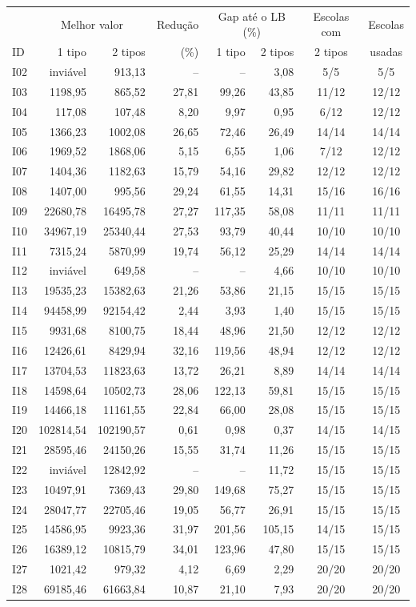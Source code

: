 \begin{tabular}{lrrrrrcc}
\hline
 & \multicolumn{2}{c}{Melhor valor} & Redução & \multicolumn{2}{c}{Gap até o LB (\%)} & Escolas com & Escolas \\
ID & 1 tipo & 2 tipos & (\%) & 1 tipo & 2 tipos & 2 tipos & usadas \\
\hline
I02 & inviável & 913,13 & -- & -- & 3,08 & 5/5 & 5/5 \\
I03 & 1198,95 & 865,52 & 27,81 & 99,26 & 43,85 & 11/12 & 12/12 \\
I04 & 117,08 & 107,48 & 8,20 & 9,97 & 0,95 & 6/12 & 12/12 \\
I05 & 1366,23 & 1002,08 & 26,65 & 72,46 & 26,49 & 14/14 & 14/14 \\
I06 & 1969,52 & 1868,06 & 5,15 & 6,55 & 1,06 & 7/12 & 12/12 \\
I07 & 1404,36 & 1182,63 & 15,79 & 54,16 & 29,82 & 12/12 & 12/12 \\
I08 & 1407,00 & 995,56 & 29,24 & 61,55 & 14,31 & 15/16 & 16/16 \\
I09 & 22680,78 & 16495,78 & 27,27 & 117,35 & 58,08 & 11/11 & 11/11 \\
I10 & 34967,19 & 25340,44 & 27,53 & 93,79 & 40,44 & 10/10 & 10/10 \\
I11 & 7315,24 & 5870,99 & 19,74 & 56,12 & 25,29 & 14/14 & 14/14 \\
I12 & inviável & 649,58 & -- & -- & 4,66 & 10/10 & 10/10 \\
I13 & 19535,23 & 15382,63 & 21,26 & 53,86 & 21,15 & 15/15 & 15/15 \\
I14 & 94458,99 & 92154,42 & 2,44 & 3,93 & 1,40 & 15/15 & 15/15 \\
I15 & 9931,68 & 8100,75 & 18,44 & 48,96 & 21,50 & 12/12 & 12/12 \\
I16 & 12426,61 & 8429,94 & 32,16 & 119,56 & 48,94 & 12/12 & 12/12 \\
I17 & 13704,53 & 11823,63 & 13,72 & 26,21 & 8,89 & 14/14 & 14/14 \\
I18 & 14598,64 & 10502,73 & 28,06 & 122,13 & 59,81 & 15/15 & 15/15 \\
I19 & 14466,18 & 11161,55 & 22,84 & 66,00 & 28,08 & 15/15 & 15/15 \\
I20 & 102814,54 & 102190,57 & 0,61 & 0,98 & 0,37 & 14/15 & 14/15 \\
I21 & 28595,46 & 24150,26 & 15,55 & 31,74 & 11,26 & 15/15 & 15/15 \\
I22 & inviável & 12842,92 & -- & -- & 11,72 & 15/15 & 15/15 \\
I23 & 10497,91 & 7369,43 & 29,80 & 149,68 & 75,27 & 15/15 & 15/15 \\
I24 & 28047,77 & 22705,46 & 19,05 & 56,77 & 26,91 & 15/15 & 15/15 \\
I25 & 14586,95 & 9923,36 & 31,97 & 201,56 & 105,15 & 14/15 & 15/15 \\
I26 & 16389,12 & 10815,79 & 34,01 & 123,96 & 47,80 & 15/15 & 15/15 \\
I27 & 1021,42 & 979,32 & 4,12 & 6,69 & 2,29 & 20/20 & 20/20 \\
I28 & 69185,46 & 61663,84 & 10,87 & 21,10 & 7,93 & 20/20 & 20/20 \\
\hline
\end{tabular}
